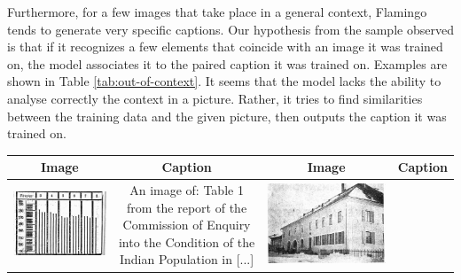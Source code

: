 Furthermore, for a few images that take place in a general context, Flamingo tends to generate very specific captions. Our hypothesis from the sample observed is that if it recognizes a few elements that coincide with an image it was trained on, the model associates it to the paired caption it was trained on. Examples are shown in Table \ref{tab:out-of-context}. It seems that the model lacks the ability to analyse correctly the context in a picture. Rather, it tries to find similarities between the training data and the given picture, then outputs the caption it was trained on.

\begin{table}[ht]
    \centering
    \setlength{\tabcolsep}{5pt}  %
    \begin{tabular}{c|c|c|c}
        \textbf{Image} & \textbf{Caption} & \textbf{Image} & \textbf{Caption} \\
        \hline
        \begin{minipage}[c]{0.2\linewidth}
            \includegraphics[width=\linewidth]{Images/graph1.png}
        \end{minipage} &
        \begin{minipage}[c]{0.2\linewidth}
            An image of: Table 1 from the report of the Commission of Enquiry into the Condition of the Indian Population in [...]
        \end{minipage} &
        \begin{minipage}[c]{0.2\linewidth}
            \includegraphics[width=\linewidth]{Images/building.png}

\end{minipage}
\end{tabular}
\end{table}
